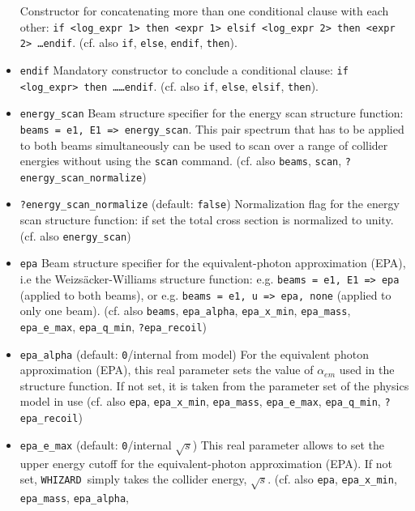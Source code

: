 \documentclass[12pt]{book}
\newcommand{\ttt}[1]{\texttt{#1}}
\newcommand{\whizard}{\texttt{WHIZARD}}
\begin{document}
\begin{itemize}
Constructor for concatenating more than one conditional clause with
each other: \ttt{if <log\_expr 1> then <expr 1> elsif <log\_expr 2>
then <expr 2> \ldots endif}. (cf. also \ttt{if}, \ttt{else},
\ttt{endif}, \ttt{then}). 
\item
\ttt{endif} \newline
Mandatory constructor to conclude a conditional clause: \ttt{if
  <log\_expr> then \ldots \ldots endif}. (cf. also \ttt{if},
\ttt{else}, \ttt{elsif}, \ttt{then}).
\item
\ttt{energy\_scan} \newline
Beam structure specifier for the energy scan structure function:
\ttt{beams = e1, E1 => energy\_scan}. This pair spectrum that has to
be applied to both beams simultaneously can be used to scan over a
range of collider energies without using the \ttt{scan} command.
(cf. also \ttt{beams}, \ttt{scan}, \ttt{?energy\_scan\_normalize})
\item
\ttt{?energy\_scan\_normalize} \qquad (default: \ttt{false}) \newline
Normalization flag for the energy scan structure function: if set the
total cross section is normalized to unity. (cf. also
\ttt{energy\_scan})
\item
\ttt{epa} \newline
Beam structure specifier for the equivalent-photon approximation
(EPA), i.e the Weizs\"acker-Williams structure function:
e.g. \ttt{beams = e1, E1 => epa} (applied to both beams), or
e.g. \ttt{beams = e1, u => epa, none} (applied to only one
beam). (cf. also \ttt{beams}, \ttt{epa\_alpha}, \ttt{epa\_x\_min},
\ttt{epa\_mass}, \ttt{epa\_e\_max}, \ttt{epa\_q\_min},
\ttt{?epa\_recoil}) 
\item
\ttt{epa\_alpha} \qquad (default: \ttt{0}/internal from model)
\newline
For the equivalent photon approximation (EPA), this real parameter
sets the value of $\alpha_{em}$ used in the structure function. If not
set, it is taken from the parameter set of the physics model in use
(cf. also \ttt{epa}, \ttt{epa\_x\_min}, \ttt{epa\_mass},
\ttt{epa\_e\_max}, \ttt{epa\_q\_min}, \ttt{?epa\_recoil})
\item
\ttt{epa\_e\_max} \qquad (default: \ttt{0}/internal $\sqrt{s}$)
\newline
This real parameter allows to set the upper energy cutoff for the
equivalent-photon approximation (EPA). If not set, \whizard\ simply
takes the collider energy, $\sqrt{s}$. (cf. also \ttt{epa},
\ttt{epa\_x\_min}, \ttt{epa\_mass}, \ttt{epa\_alpha},

\end{itemize}
\end{document}
